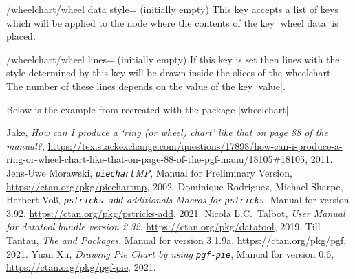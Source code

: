 \documentclass[a4paper,english,dvipsnames]{ltxdoc}
\begin{document}
\begin{stylekey}{/wheelchart/wheel data style= (initially \normalfont empty)}
This key accepts a list of keys which will be applied to the node where the contents of the key |wheel data| is placed.
\end{stylekey}
\begin{stylekey}{/wheelchart/wheel lines= (initially \normalfont empty)}
If this key is set then lines with the style determined by this key will be drawn inside the slices of the wheelchart. The number of these lines depends on the value of the key |value|.

Below is the example from \cite[Subsection 7.6]{TtTaPGFp} recreated with the package |wheelchart|.
\begin{codeexample}[width=10cm]
\end{codeexample}
\end{stylekey}
\begin{thebibliography}{9}
Jake,
\emph{How can I produce a `ring (or wheel) chart' like that on page 88 of the {\upshape\pgfname} manual?},
\url{https://tex.stackexchange.com/questions/17898/how-can-i-produce-a-ring-or-wheel-chart-like-that-on-page-88-of-the-pgf-manu/18105#18105},
2011.
Jens-Uwe Morawski,
\emph{{\upshape\texttt{piechart}\textsf{MP}}},
Manual for Preliminary Version,
\url{https://ctan.org/pkg/piechartmp},
2002.
Dominique Rodriguez, Michael Sharpe, Herbert Vo{\ss},
\emph{{\upshape\texttt{pstricks-add} \textsf{additionals Macros for} \texttt{pstricks}}},
Manual for version 3.92,
\url{https://ctan.org/pkg/pstricks-add},
2021.
Nicola L.C.~Talbot,
\emph{User Manual for datatool bundle version 2.32},
\url{https://ctan.org/pkg/datatool},
2019.
Till Tantau,
\emph{The \tikzname{} and {\upshape\pgfname} Packages},
Manual for version 3.1.9a,
\url{https://ctan.org/pkg/pgf},
2021.
Yuan Xu,
\emph{Drawing Pie Chart by using {\upshape\texttt{pgf-pie}}},
Manual for version 0.6,
\url{https://ctan.org/pkg/pgf-pie},
2021.
\end{thebibliography}
\printindex
\end{document}

